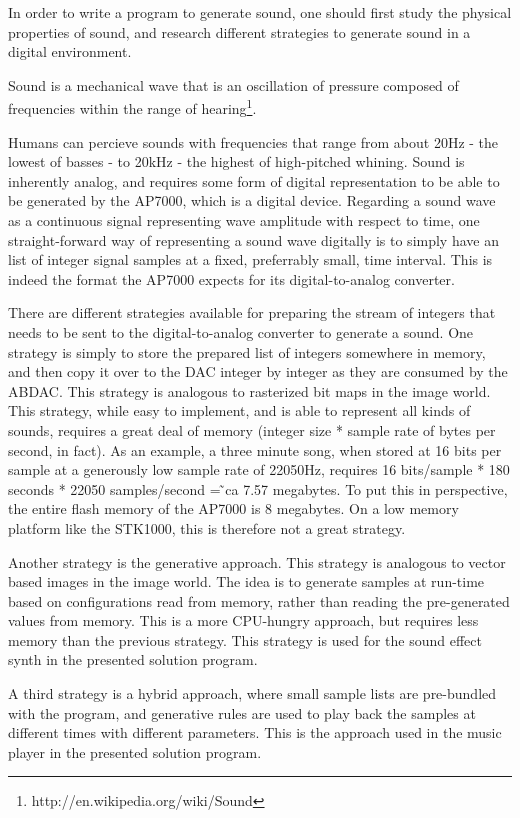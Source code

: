 In order to write a program to generate sound, one should first study the physical properties of sound, and research different strategies to generate sound in a digital environment.

Sound is a mechanical wave that is an oscillation of pressure composed of frequencies within the range of hearing\footnote{http://en.wikipedia.org/wiki/Sound}.

Humans can percieve sounds with frequencies that range from about 20Hz - the lowest of basses - to 20kHz - the highest of high-pitched whining.
Sound is inherently analog, and requires some form of digital representation to be able to be generated by the AP7000, which is a digital device.
Regarding a sound wave as a continuous signal representing wave amplitude with respect to time, one straight-forward way of representing a sound wave digitally is to simply have an list of integer signal samples at a fixed, preferrably small, time interval.
This is indeed the format the AP7000 expects for its digital-to-analog converter.

There are different strategies available for preparing the stream of integers that needs to be sent to the digital-to-analog converter to generate a sound.
One strategy is simply to store the prepared list of integers somewhere in memory, and then copy it over to the DAC integer by integer as they are consumed by the ABDAC.
This strategy is analogous to rasterized bit maps in the image world.
This strategy, while easy to implement, and is able to represent all kinds of sounds, requires a great deal of memory (integer size * sample rate of bytes per second, in fact).
As an example, a three minute song, when stored at 16 bits per sample at a generously low sample rate of 22050Hz, requires 16 bits/sample * 180 seconds * 22050 samples/second = ̃ca 7.57 megabytes.
To put this in perspective, the entire flash memory of the AP7000 is 8 megabytes.
On a low memory platform like the STK1000, this is therefore not a great strategy.

Another strategy is the generative approach.
This strategy is analogous to vector based images in the image world.
The idea is to generate samples at run-time based on configurations read from memory, rather than reading the pre-generated values from memory.
This is a more CPU-hungry approach, but requires less memory than the previous strategy.
This strategy is used for the sound effect synth in the presented solution program.

A third strategy is a hybrid approach, where small sample lists are pre-bundled with the program, and generative rules are used to play back the samples at different times with different parameters.
This is the approach used in the music player in the presented solution program.
